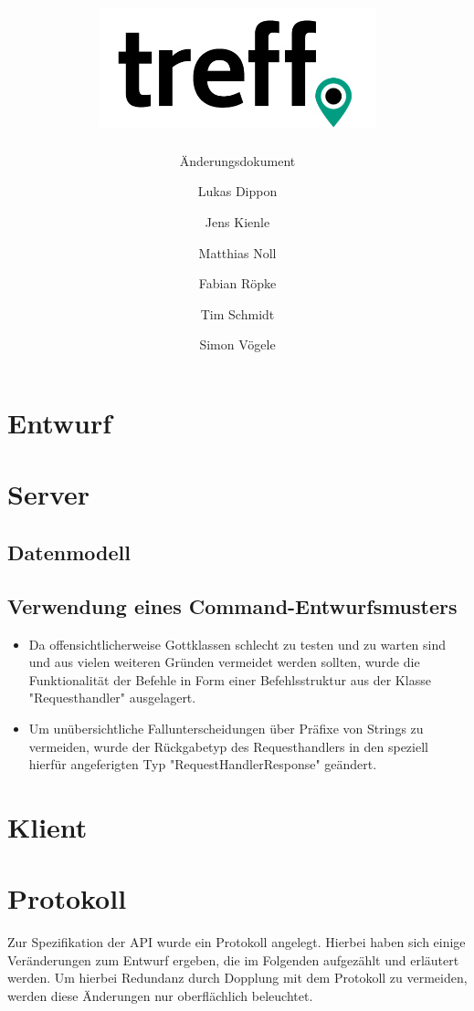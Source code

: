 \documentclass[parskip=full,11pt]{scrartcl}
\title{\includegraphics[width = 80mm]{images/logo_crop.png}}
\subtitle{\huge Änderungsdokument}
\author{Lukas Dippon
        \and Jens Kienle
        \and Matthias Noll
        \and Fabian Röpke
        \and Tim Schmidt
        \and Simon Vögele}
\begin{document}
\maketitle
\thispagestyle{empty} %

\pagebreak
\tableofcontents

\pagebreak
\section{Entwurf}



\pagebreak
\section{Server}

\subsection{Datenmodell}

\subsection{Verwendung eines Command-Entwurfsmusters}
	\begin{itemize}
	\item Da offensichtlicherweise Gottklassen schlecht zu testen und zu warten sind und
	aus vielen weiteren Gründen vermeidet werden sollten, wurde die Funktionalität
	der Befehle in Form einer Befehlsstruktur aus der Klasse "Requesthandler"
	ausgelagert.
	\item Um unübersichtliche Fallunterscheidungen über Präfixe von Strings
	zu vermeiden, wurde der Rückgabetyp des Requesthandlers in den speziell
	hierfür angeferigten Typ "RequestHandlerResponse" geändert.
	\end{itemize}


\pagebreak
\section{Klient}



\pagebreak
\section{Protokoll}

Zur Spezifikation der API wurde ein Protokoll angelegt.
Hierbei haben sich einige Veränderungen zum Entwurf ergeben,
die im Folgenden aufgezählt und erläutert werden.
Um hierbei Redundanz durch Dopplung mit dem Protokoll zu vermeiden,
werden diese Änderungen nur oberflächlich beleuchtet.
\end{document}
